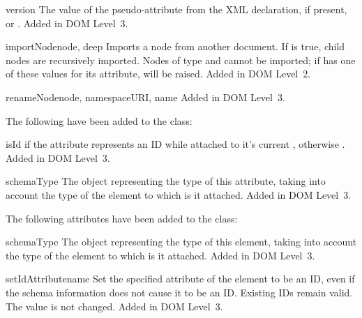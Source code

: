 \documentclass{howto}
\newcommand{\attribute}[1]{\code{#1}}
\begin{document}
\begin{memberdesc}[Document]{version}
  The value of the \attribute{version} pseudo-attribute from the XML
  declaration, if present, or .
  Added in DOM Level~3.
\end{memberdesc}

\begin{methoddesc}[Document]{importNode}{node, deep}
  Imports a node  from another document.  If  is
  true, child nodes are recursively imported.  Nodes of type
   and  cannot be
  imported; if  has one of these values for its
   attribute, 
  will be raised.
  Added in DOM Level~2.
\end{methoddesc}

\begin{methoddesc}[Document]{renameNode}{node, namespaceURI, name}
  Added in DOM Level~3.
\end{methoddesc}


The following have been added to the  class:

\begin{memberdesc}[Attr]{isId}
   if the attribute represents an ID while attached to it's
  current , otherwise .
  Added in DOM Level~3.
\end{memberdesc}

\begin{memberdesc}[Attr]{schemaType}
  The  object representing the type of this attribute,
  taking into account the type of the element to which is it attached.
  Added in DOM Level~3.
\end{memberdesc}

The following attributes have been added to the  class:

\begin{memberdesc}[Element]{schemaType}
  The  object representing the type of this element,
  taking into account the type of the element to which is it attached.
  Added in DOM Level~3.
\end{memberdesc}

\begin{methoddesc}[Element]{setIdAttribute}{name}
  Set the specified attribute of the element to be an ID, even if the
  schema information does not cause it to be an ID.  Existing IDs
  remain valid.  The  value is not changed.
  Added in DOM Level~3.
\end{methoddesc}
\end{document}
